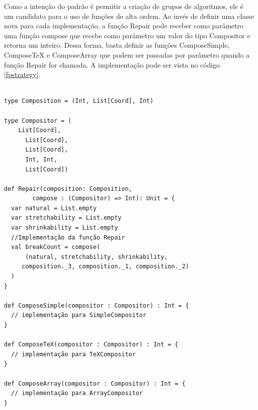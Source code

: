 Como a intenção do padrão é permitir a criação de 
grupos de algoritmos, ele é um candidato para o uso 
de funções de alta ordem. Ao invés de definir 
uma classe nova para cada implementação, a 
função Repair pode receber como parâmetro uma 
função compose que recebe como parâmetro um valor 
do tipo Compositor e retorna 
um inteiro. Dessa forma, basta definir as 
funções ComposeSimple, ComposeTeX e ComposeArray 
que podem ser passadas por parâmetro quando a 
função Repair for chamada. A implementação pode 
ser vista no código \ref{fpstrategy}.

\begin{lstlisting}[caption={Strategy Funcional},label=fpstrategy]
    
type Composition = (Int, List[Coord], Int)

type Compositor = (
    List[Coord],
      List[Coord],
      List[Coord],
      Int, Int,
      List[Coord])

def Repair(composition: Composition,
        compose : (Compositor) => Int): Unit = {
  var natural = List.empty
  var stretchability = List.empty
  var shrinkability = List.empty
  //Implementação da função Repair
  val breakCount = compose(
      (natural, stretchability, shrinkability,
     composition._3, composition._1, composition._2)
  )
}

def ComposeSimple(compositor : Compositor) : Int = {
  // implementação para SimpleCompositor
}

def ComposeTeX(compositor : Compositor) : Int = {
  // implementação para TeXCompositor
}

def ComposeArray(compositor : Compositor) : Int = {
  // implementação para ArrayCompositor
}
    
\end{lstlisting}

